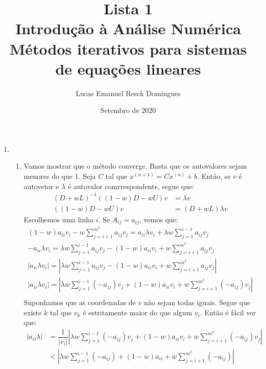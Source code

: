 \documentclass{article}
\title{Lista 1 \\
\large Introdução à Análise Numérica \\
Métodos iterativos para sistemas de equações lineares}
\author{Lucas Emanuel Resck Domingues}
\date{Setembro de 2020}
\begin{document}
    \maketitle

    \begin{enumerate}
        \item \begin{enumerate}
                \item Vamos mostrar que o método converge.
                    Basta que os autovalores sejam menores do que 1.
                    Seja $C$ tal que $x^{(n+1)} = Cx^{(n)} + b$.
                    Então, se $v$ é autovetor e $\lambda$ é autovalor comrrespondente, segue que:
                    \begin{align*}
                        (D+wL)^{-1}((1-w)D-wU)v &= \lambda v \\
                        ((1-w)D-wU)v &= (D+wL)\lambda v
                    \end{align*}
                    Escolhemos uma linha $i$. Se $A_{ij}=a_{ij}$, vemos que:
                    \begin{align*}
                        (1-w)a_{ii}v_i - w \sum_{j=i+1}^{m^2} a_{ij}v_j = a_{ii} \lambda v_i + \lambda w \sum_{j=1}^{i-1} a_{ij}v_j \\
                        -a_{ii} \lambda v_i = \lambda w \sum_{j=1}^{i-1} a_{ij}v_j - (1-w)a_{ii}v_i + w \sum_{j=i+1}^{m^2} a_{ij}v_j \\
                        |a_{ii} \lambda v_i| = \left|\lambda w \sum_{j=1}^{i-1} a_{ij}v_j - (1-w)a_{ii}v_i + w \sum_{j=i+1}^{m^2} a_{ij}v_j\right| \\
                        |a_{ii} \lambda v_i| = \left|\lambda w \sum_{j=1}^{i-1} (-a_{ij})v_j + (1-w)a_{ii}v_i + w \sum_{j=i+1}^{m^2} (-a_{ij})v_j\right| \\
                    \end{align*}
                    Suponhamos que as coordenadas de $v$ não sejam todas iguais. Segue que existe $k$ tal que $v_k$ é estritamente maior do que algum $v_i$. Então é fácil ver que:
                    \begin{align*}
                        |a_{ii} \lambda| &= \dfrac{1}{|v_i|} \left|\lambda w \sum_{j=1}^{i-1} (-a_{ij})v_j + (1-w)a_{ii}v_i + w \sum_{j=i+1}^{m^2} (-a_{ij})v_j\right| \\
                        &< \left|\lambda w \sum_{j=1}^{i-1} (-a_{ij}) + (1-w)a_{ii} + w \sum_{j=i+1}^{m^2} (-a_{ij})\right| \\

\end{align*}
\end{enumerate}
\end{enumerate}
\end{document}
